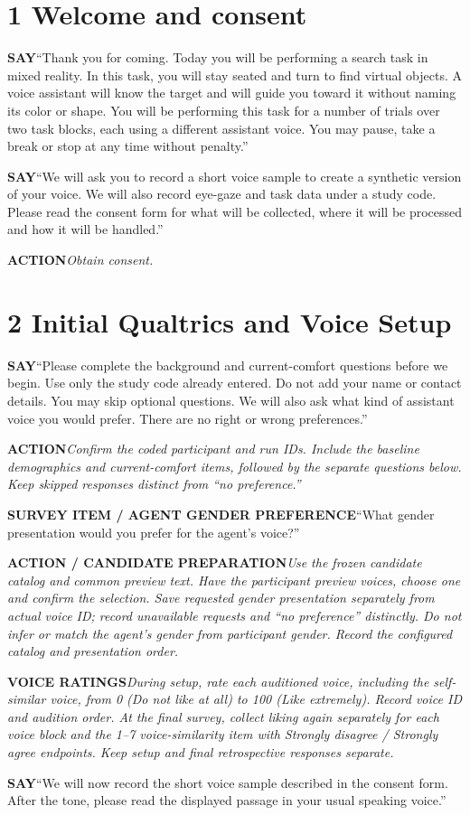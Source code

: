 \documentclass[11pt,letterpaper]{article}
\newcommand{\step}[1]{\Needspace{7\baselineskip}\section{#1}}
\newcommand{\say}[2]{\Needspace{4\baselineskip}\par\textbf{#1}\enspace #2\par}
\newcommand{\action}[2]{\Needspace{3\baselineskip}\par{\color{ActionInk}\textbf{#1}\enspace\textit{#2}}\par}
\begin{document}
\step{1 Welcome and consent}
\say{SAY}{``Thank you for coming. Today you will be performing a search task in mixed reality. In this task, you will stay seated and turn to find virtual objects. A voice assistant will know the target and will guide you toward it without naming its color or shape. You will be performing this task for a number of trials over two task blocks, each using a different assistant voice. You may pause, take a break or stop at any time without penalty.''}
\say{SAY}{``We will ask you to record a short voice sample to create a synthetic version of your voice. We will also record eye-gaze and task data under a study code. Please read the consent form for what will be collected, where it will be processed and how it will be handled.''}

\action{ACTION}{Obtain consent.}
\step{2 Initial Qualtrics and Voice Setup}

\say{SAY}{``Please complete the background and current-comfort questions before we begin. Use only the study code already entered. Do not add your name or contact details. You may skip optional questions. We will also ask what kind of assistant voice you would prefer. There are no right or wrong preferences.''}
\action{ACTION}{Confirm the coded participant and run IDs. Include the baseline demographics and current-comfort items, followed by the separate questions below. Keep skipped responses distinct from ``no preference.''}

\say{SURVEY ITEM / AGENT GENDER PREFERENCE}{``What gender presentation would you prefer for the agent's voice?''}

\action{ACTION / CANDIDATE PREPARATION}{Use the frozen candidate catalog and common preview text. Have the participant preview voices, choose one and confirm the selection. Save requested gender presentation separately from actual voice ID; record unavailable requests and ``no preference'' distinctly. Do not infer or match the agent's gender from participant gender. Record the configured catalog and presentation order.}
\action{VOICE RATINGS}{During setup, rate each auditioned voice, including the self-similar voice, from 0 (Do not like at all) to 100 (Like extremely). Record voice ID and audition order. At the final survey, collect liking again separately for each voice block and the 1--7 voice-similarity item with Strongly disagree / Strongly agree endpoints. Keep setup and final retrospective responses separate.}
\say{SAY}{``We will now record the short voice sample described in the consent form. After the tone, please read the displayed passage in your usual speaking voice.''}
\end{document}
